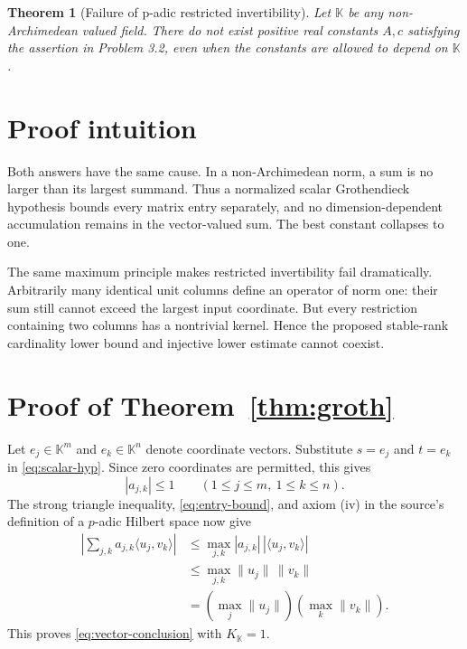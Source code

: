 \documentclass[11pt]{article}
\newtheorem{theorem}{Theorem}
\newcommand{\K}{\mathbb K}
\begin{document}
\begin{theorem}[Failure of p-adic restricted invertibility]\label{thm:bt}
Let $\K$ be any non-Archimedean valued field.  There do not exist positive
real constants $A,c$ satisfying the assertion in Problem 3.2, even when the
constants are allowed to depend on $\K$.
\end{theorem}

\section{Proof intuition}

Both answers have the same cause.  In a non-Archimedean norm, a sum is no
larger than its largest summand.  Thus a normalized scalar Grothendieck
hypothesis bounds every matrix entry separately, and no dimension-dependent
accumulation remains in the vector-valued sum.  The best constant collapses
to one.

The same maximum principle makes restricted invertibility fail dramatically.
Arbitrarily many identical unit columns define an operator of norm one: their
sum still cannot exceed the largest input coordinate.  But every restriction
containing two columns has a nontrivial kernel.  Hence the proposed stable-rank
cardinality lower bound and injective lower estimate cannot coexist.

\section{Proof of Theorem~\ref{thm:groth}}

Let $e_j\in\K^m$ and $e_k\in\K^n$ denote coordinate vectors.  Substitute
$s=e_j$ and $t=e_k$ in \eqref{eq:scalar-hyp}.  Since zero coordinates are
permitted, this gives
\begin{equation}\label{eq:entry-bound}
             |a_{j,k}|\le 1 \qquad(1\le j\le m,\ 1\le k\le n).
\end{equation}
The strong triangle inequality, \eqref{eq:entry-bound}, and axiom (iv) in the
source's definition of a $p$-adic Hilbert space now give
\begin{align*}
 \left|\sum_{j,k}a_{j,k}\langle u_j,v_k\rangle\right|
 &\le \max_{j,k}|a_{j,k}|\,|\langle u_j,v_k\rangle|\\
 &\le \max_{j,k}\lVert u_j\rVert\,\lVert v_k\rVert\\
 &=\left(\max_j\lVert u_j\rVert\right)
   \left(\max_k\lVert v_k\rVert\right).
\end{align*}
This proves \eqref{eq:vector-conclusion} with $K_{\K}=1$.
\end{document}
